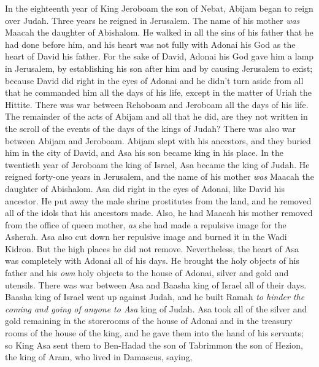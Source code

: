 \begin{biblechapter} %
 In the eighteenth year of King Jeroboam the son of Nebat, Abijam began to reign over Judah.
\verse Three years he reigned in Jerusalem. The name of his mother \textit{was} Maacah the daughter of Abishalom.
\verse He walked in all the sins of his father that he had done before him, and his heart was not fully with Adonai his God as the heart of David his father.
\verse For the sake of David, Adonai his God gave him a lamp in Jerusalem, by establishing his son after him and by causing Jerusalem to exist;
\verse because David did right in the eyes of Adonai and he didn’t turn aside from all that he commanded him all the days of his life, except in the matter of Uriah the Hittite.
\verse There was war between Rehoboam and Jeroboam all the days of his life.
\verse The remainder of the acts of Abijam and all that he did, are they not written in the scroll of the events of the days of the kings of Judah? There was also war between Abijam and Jeroboam.
\verse Abijam slept with his ancestors, and they buried him in the city of David, and Asa his son became king in his place.
 In the twentieth year of Jeroboam the king of Israel, Asa became the king of Judah.
\verse He reigned forty-one years in Jerusalem, and the name of his mother \textit{was} Maacah the daughter of Abishalom.
\verse Asa did right in the eyes of Adonai, like David his ancestor.
\verse He put away the male shrine prostitutes from the land, and he removed all of the idols that his ancestors made.
\verse Also, he had Maacah his mother removed from the office of queen mother, \textit{as} she had made a repulsive image for the Asherah. Asa also cut down her repulsive image and burned it in the Wadi Kidron.
\verse But the high places he did not remove. Nevertheless, the heart of Asa was completely with Adonai all of his days.
\verse He brought the holy objects of his father and his \textit{own} holy objects to the house of Adonai, silver and gold and utensils.
\verse There was war between Asa and Baasha king of Israel all of their days.
\verse Baasha king of Israel went up against Judah, and he built Ramah \textit{to hinder the coming and going of anyone to Asa} king of Judah.
\verse Asa took all of the silver and gold remaining in the storerooms of the house of Adonai and in the treasury rooms of the house of the king, and he gave them into the hand of his servants; so King Asa sent them to Ben-Hadad the son of Tabrimmon the son of Hezion, the king of Aram, who lived in Damascus, saying,

\end{biblechapter}

